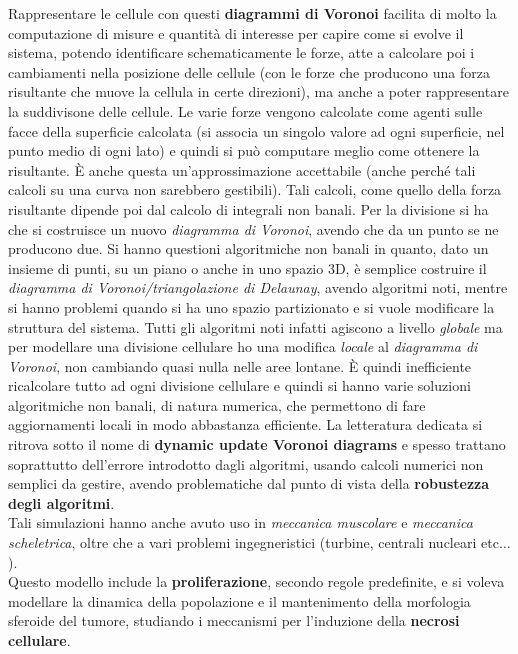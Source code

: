 \documentclass[a4paper,12pt, oneside]{book}
\begin{document}
Rappresentare le cellule con questi \textbf{diagrammi di Voronoi} facilita di
molto la computazione di misure e quantità di interesse per capire come si
evolve il sistema, potendo identificare schematicamente le forze, atte a
calcolare poi i cambiamenti nella posizione delle cellule (con le forze che
producono una forza risultante che muove la cellula in certe direzioni), ma
anche a poter rappresentare la suddivisone delle cellule. Le varie forze vengono
calcolate come agenti sulle facce della superficie calcolata (si associa un
singolo valore ad ogni superficie, nel punto medio di ogni lato) e quindi si può
computare meglio come ottenere la risultante. È anche questa un'approssimazione
accettabile (anche perché tali calcoli su una curva non sarebbero
gestibili). Tali calcoli, come quello della forza risultante dipende poi dal
calcolo di integrali non banali. Per la divisione si ha che si costruisce un
nuovo \textit{diagramma di Voronoi}, avendo che da un punto se ne producono
due. Si hanno questioni algoritmiche non banali in quanto, dato un insieme di
punti, su un piano o anche in uno spazio 3D, è semplice costruire il
\textit{diagramma di Voronoi/triangolazione di Delaunay}, avendo algoritmi noti,
mentre si hanno problemi quando si ha uno spazio partizionato e si vuole
modificare la struttura del sistema. Tutti gli algoritmi noti infatti agiscono a
livello \textit{globale} ma per modellare una divisione cellulare ho una
modifica \textit{locale} al \textit{diagramma di Voronoi}, non cambiando quasi
nulla nelle aree lontane. È quindi inefficiente ricalcolare tutto ad ogni
divisione cellulare e quindi si hanno varie soluzioni algoritmiche non
banali, di natura numerica, che permettono di fare aggiornamenti locali in modo
abbastanza efficiente. La letteratura dedicata si ritrova sotto il nome di
\textbf{dynamic update Voronoi diagrams} e spesso trattano soprattutto
dell'errore introdotto dagli algoritmi, usando calcoli numerici non semplici da
gestire, avendo problematiche dal punto di vista della \textbf{robustezza degli
  algoritmi}. \\
Tali simulazioni hanno anche avuto uso in \textit{meccanica
muscolare} e \textit{meccanica scheletrica}, oltre che a vari problemi
ingegneristici (turbine, centrali nucleari etc$\ldots$).\\
Questo modello include la \textbf{proliferazione}, secondo regole predefinite, e
si voleva modellare la dinamica della popolazione e il mantenimento della
morfologia sferoide del tumore, studiando i meccanismi per l'induzione della
\textbf{necrosi cellulare}.
\end{document}
